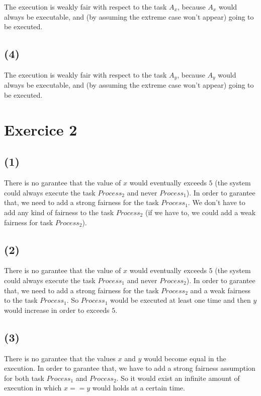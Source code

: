 \documentclass[a4paper,11pt]{report}
\begin{document}
The execution is weakly fair with respect to the task $A_x$, because $A_x$ would
always be executable, and (by assuming the extreme case won't appear) going to
be executed.

\subsection*{(4)}

The execution is weakly fair with respect to the task $A_y$, because $A_y$ would
always be executable, and (by assuming the extreme case won't appear) going to
be executed.

\section*{Exercice 2}

\subsection*{(1)}

There is no garantee that the value of $x$ would eventually exceeds $5$ (the
system could always execute the task $Process_2$ and never $Process_1$). In
order to garantee that, we need to add a strong fairness for the task
$Process_1$. We don't have to add any kind of fairness to the task $Process_2$
(if we have to, we could add a weak fairness for task $Process_2$).

\subsection*{(2)}

There is no garantee that the value of $x$ would eventually exceeds $5$ (the
system could always execute the task $Process_1$ and never $Process_2$). In
order to garantee that, we need to add a strong fairness for the task
$Process_2$ and a weak fairness to the task $Process_1$. So $Process_1$ would be
executed at least one time and then $y$ would increase in order to exceeds $5$.

\subsection*{(3)}

There is no garantee that the values $x$ and $y$ would become equal in the
execution. In order to garantee that, we have to add a strong fairness
assumption for both task $Process_1$ and $Process_2$. So it would exist an
infinite amount of execution in which $x==y$ would holds at a certain time.
\end{document}
